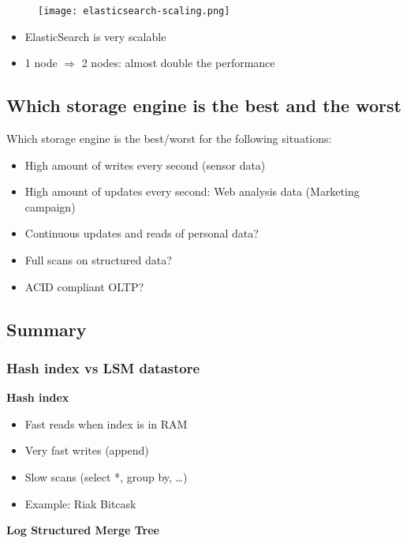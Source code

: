 \documentclass{article}
\begin{document}
\begin{figure}[H]
    \centering
    \texttt{[image: elasticsearch-scaling.png]}
\end{figure}

\begin{itemize}
    \item ElasticSearch is very scalable
    \item 1 node $\Rightarrow$ 2 nodes: almost double the performance
\end{itemize}

\subsection{Which storage engine is the best and the worst}

Which storage engine is the best/worst for the following situations:

\begin{itemize}
    \item High amount of writes every second (sensor data)
    \item High amount of updates every second: Web analysis data (Marketing campaign)
    \item Continuous updates and reads of personal data? 
    \item Full scans on structured data?
    \item ACID compliant OLTP?
\end{itemize}

\subsection{Summary}

\subsubsection{Hash index vs LSM datastore}

\textbf{Hash index}

\begin{itemize}
    \item Fast reads when index is in RAM
    \item Very fast writes (append)
    \item Slow scans (select *, group by, \dots)
    \item Example: Riak Bitcask
\end{itemize}

\textbf{Log Structured Merge Tree}
\end{document}

